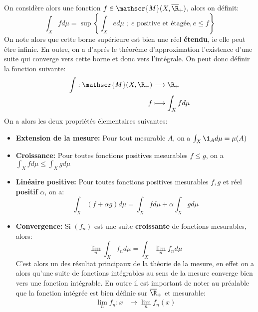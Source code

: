\subsection*{}
On considère alors une fonction \(f \in \mathscr{M}(X, \overline{\R}_+)\), alors on définit:
\[
   \int_X fd\mu = \sup \left\{\int_X ed\mu \; ; \; e \text{ positive et étagée}, e \leq f\right\}
\]
On note alors que cette borne supérieure est bien une réel \textbf{étendu}, ie elle peut être infinie. En outre, on a d'aprés le théorème d'approximation l'existence d'une suite qui converge vers cette borne et donc vers l'intégrale.
On peut donc définir la fonction suivante:
\[
   \begin{aligned}
      \int : \mathscr{M}(X, \overline{\R}_+) &\longrightarrow \overline{\R}_+\\
      f &\longmapsto \int_X fd\mu
   \end{aligned}
\]
On a alors les deux propriétés élementaires suivantes:
\begin{itemize}
   \item \textbf{Extension de la mesure:} Pour tout mesurable \(A\), on a \(\int_X \1_A d\mu = \mu(A)\)
   \item \textbf{Croissance:} Pour toutes fonctions positives mesurables \(f \leq g\), on a \(\int_X f d\mu \leq \int_X g d\mu\)
   \item \textbf{Linéaire positive:} Pour toutes fonctions positives mesurables \(f, g\) et réel \textbf{positif} \(\alpha\), on a:
   \[
      \int_X (f + \alpha g) d\mu = \int_X fd\mu + \alpha \int_{X}gd\mu
   \]
   \item \textbf{Convergence:} Si \((f_n)\) est une suite \textbf{croissante} de fonctions mesurables, alors:
   \[
      \lim_{n} \int_X f_nd\mu = \int_X \lim_{n} f_nd\mu
   \]
   C'est alors un des résultat principaux de la théorie de la mesure, en effet on a alors qu'une suite de fonctions intégrables au sens de la mesure converge bien vers une fonction intégrable. En outre il est important de noter au préalable que la fonction intégrée est bien définie sur \(\overline{\R}_+\) et mesurable:
   \[
      \begin{aligned}
         \lim_nf_n: x &\longmapsto \lim_nf_n(x)
      \end{aligned}
   \]
   
\end{itemize}

